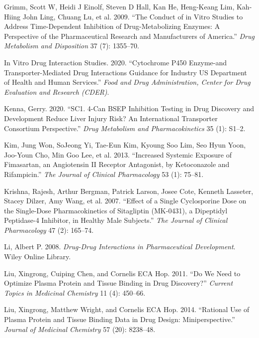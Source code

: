 \documentclass[
  11pt,
  krantz2, a4paper, twoside]{krantz}
\newlength{\cslhangindent}
\newlength{\cslentryspacingunit} %
\newenvironment{CSLReferences}[2] %
 {%
  \setlength{\parindent}{0pt}
  \ifodd #1
  \let\oldpar\par
  \def\par{\hangindent=\cslhangindent\oldpar}
  \fi
  \setlength{\parskip}{#2\cslentryspacingunit}
 }%
 {}
\begin{document}
\begin{CSLReferences}{1}{0}
\leavevmode{}%
Grimm, Scott W, Heidi J Einolf, Steven D Hall, Kan He, Heng-Keang Lim, Kah-Hiing John Ling, Chuang Lu, et al. 2009. {``The Conduct of in Vitro Studies to Address Time-Dependent Inhibition of Drug-Metabolizing Enzymes: A Perspective of the Pharmaceutical Research and Manufacturers of America.''} \emph{Drug Metabolism and Disposition} 37 (7): 1355--70.

\leavevmode{}%
In Vitro Drug Interaction Studies. 2020. {``Cytochrome P450 Enzyme-and Transporter-Mediated Drug Interactions Guidance for Industry US Department of Health and Human Services.''} \emph{Food and Drug Administration, Center for Drug Evaluation and Research (CDER)}.

\leavevmode{}%
Kenna, Gerry. 2020. {``SC1. 4-Can BSEP Inhibition Testing in Drug Discovery and Development Reduce Liver Injury Risk? An International Transporter Consortium Perspective.''} \emph{Drug Metabolism and Pharmacokinetics} 35 (1): S1--2.

\leavevmode{}%
Kim, Jung Won, SoJeong Yi, Tae-Eun Kim, Kyoung Soo Lim, Seo Hyun Yoon, Joo-Youn Cho, Min Goo Lee, et al. 2013. {``Increased Systemic Exposure of Fimasartan, an Angiotensin II Receptor Antagonist, by Ketoconazole and Rifampicin.''} \emph{The Journal of Clinical Pharmacology} 53 (1): 75--81.

\leavevmode{}%
Krishna, Rajesh, Arthur Bergman, Patrick Larson, Josee Cote, Kenneth Lasseter, Stacey Dilzer, Amy Wang, et al. 2007. {``Effect of a Single Cyclosporine Dose on the Single-Dose Pharmacokinetics of Sitagliptin (MK-0431), a Dipeptidyl Peptidase-4 Inhibitor, in Healthy Male Subjects.''} \emph{The Journal of Clinical Pharmacology} 47 (2): 165--74.

\leavevmode{}%
Li, Albert P. 2008. \emph{Drug-Drug Interactions in Pharmaceutical Development}. Wiley Online Library.

\leavevmode{}%
Liu, Xingrong, Cuiping Chen, and Cornelis ECA Hop. 2011. {``Do We Need to Optimize Plasma Protein and Tissue Binding in Drug Discovery?''} \emph{Current Topics in Medicinal Chemistry} 11 (4): 450--66.

\leavevmode{}%
Liu, Xingrong, Matthew Wright, and Cornelis ECA Hop. 2014. {``Rational Use of Plasma Protein and Tissue Binding Data in Drug Design: Miniperspective.''} \emph{Journal of Medicinal Chemistry} 57 (20): 8238--48.


\end{CSLReferences}
\end{document}
